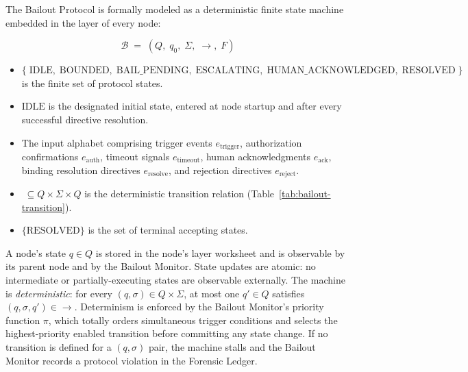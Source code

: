 The Bailout Protocol is formally modeled as a deterministic finite state machine embedded in the \fact{} layer of every \bxthree{} node:

\[
\mathcal{B} \;=\; (Q,\; q_0,\; \Sigma,\; \rightarrow,\; F)
\]

\begin{itemize}\itemsep=0pt
\item[$Q$] $\{\;\text{IDLE},\; \text{BOUNDED},\; \text{BAIL\_PENDING},\; \text{ESCALATING},\; \text{HUMAN\_ACKNOWLEDGED},\; \text{RESOLVED}\;\}$ is the finite set of protocol states.
\item[$q_0$] $\text{IDLE}$ is the designated initial state, entered at node startup and after every successful directive resolution.
\item[$\Sigma$] The input alphabet comprising trigger events $e_{\text{trigger}}$, authorization confirmations $e_{\text{auth}}$, timeout signals $e_{\text{timeout}}$, human acknowledgments $e_{\text{ack}}$, binding resolution directives $e_{\text{resolve}}$, and rejection directives $e_{\text{reject}}$.
\item[$\rightarrow$] $\; \subseteq Q \times \Sigma \times Q$ is the deterministic transition relation (Table~\ref{tab:bailout-transition}).
\item[$F$] $\{\text{RESOLVED}\}$ is the set of terminal accepting states.
\end{itemize}

A node's state $q \in Q$ is stored in the node's \fact{} layer worksheet and is observable by its parent node and by the Bailout Monitor. State updates are atomic: no intermediate or partially-executing states are observable externally. The machine is \emph{deterministic}: for every $(q, \sigma) \in Q \times \Sigma$, at most one $q' \in Q$ satisfies $(q, \sigma, q') \in \rightarrow$. Determinism is enforced by the Bailout Monitor's priority function $\pi$, which totally orders simultaneous trigger conditions and selects the highest-priority enabled transition before committing any state change. If no transition is defined for a $(q, \sigma)$ pair, the machine stalls and the Bailout Monitor records a protocol violation in the Forensic Ledger.


